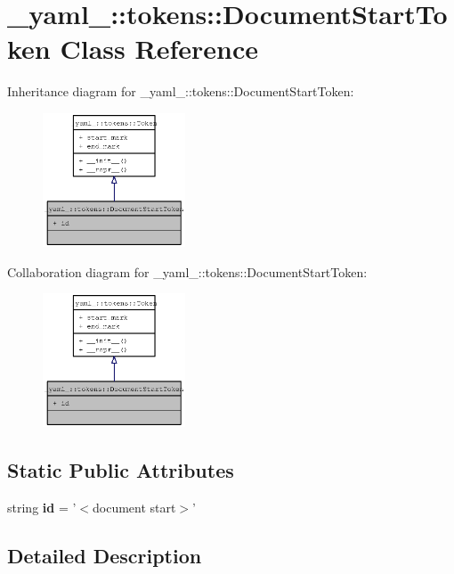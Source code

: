 \section{\_\-yaml\_\-::tokens::DocumentStartToken Class Reference}
\label{class__yaml___1_1tokens_1_1DocumentStartToken}
Inheritance diagram for \_\-yaml\_\-::tokens::DocumentStartToken:\nopagebreak
\begin{figure}[H]
\begin{center}
\leavevmode
\includegraphics[width=120pt]{class__yaml___1_1tokens_1_1DocumentStartToken__inherit__graph}
\end{center}
\end{figure}
Collaboration diagram for \_\-yaml\_\-::tokens::DocumentStartToken:\nopagebreak
\begin{figure}[H]
\begin{center}
\leavevmode
\includegraphics[width=120pt]{class__yaml___1_1tokens_1_1DocumentStartToken__coll__graph}
\end{center}
\end{figure}
\subsection*{Static Public Attributes}
\begin{CompactItemize}
\item 
string {\bf id} = '$<$document start$>$'
\end{CompactItemize}


\subsection{Detailed Description}


